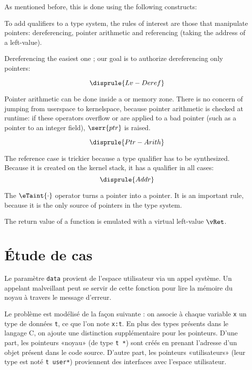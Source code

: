 As mentioned before, this is done using the following constructs:%
{\small
\begin{mathpar}

\end{mathpar}}%
To add qualifiers to a type system, the rules of interest are those that
manipulate pointers: dereferencing, pointer arithmetic and referencing (taking
the address of a left-value).

Dereferencing the easiest one ; our goal is to authorize dereferencing only
\qKernel pointers:

{\small \[ \disprule{Lv-Deref} \]}%

Pointer arithmetic can be done inside a \qUser or \qKernel memory zone. There is
no concern of jumping from userspace to kernelspace, because pointer arithmetic
is checked at runtime: if these operators overflow or are applied to a bad
pointer (such as a pointer to an integer field), $\serr{ptr}$ is raised.

{\small \[ \disprule{Ptr-Arith} \]}%

The reference case is trickier because a type qualifier has to be synthesized.
Because it is created on the kernel stack, it has a \qKernel qualifier in all
cases:
{\small \[
  \disprule{Addr}
\]}%

The $\eTaint{\cdot}$ operator turns a \qUser pointer into a \qKernel pointer.
It is an important rule, because it is the only source of \qUser pointers in the
type system.

The return value of a function is emulated with a virtual left-value $\vRet$.%
{\small \begin{mathpar}

\end{mathpar}}%

\section{Étude de cas}%

Le paramètre \texttt{data} provient de l'espace utilisateur via un appel
système. Un appelant malveillant peut se servir de cette fonction pour lire la
mémoire du noyau à travers le message d'erreur.

Le problème est modélisé de la façon suivante : on associe à chaque variable
\texttt{x} un type de données \texttt{t}, ce que l'on note \texttt{x:t}. En
plus des types présents dans le langage C, on ajoute une distinction
supplémentaire pour les pointeurs. D'une part, les pointeurs «noyau» (de type
\texttt{t~*}) sont créés en prenant l'adresse d'un objet présent dans le code
source. D'autre part, les pointeurs «utilisateurs» (leur type est noté
\texttt{t user*}) proviennent des interfaces avec l'espace utilisateur.


